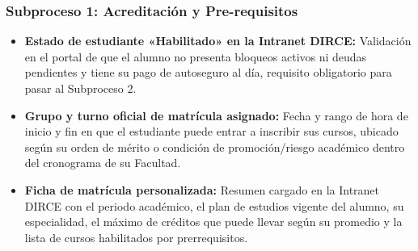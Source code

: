 \subsubsection{Subproceso 1: Acreditación y Pre-requisitos}

\begin{itemize}
    \item \textbf{Estado de estudiante «Habilitado» en la Intranet DIRCE:} Validación en el portal de que el alumno no presenta bloqueos activos ni deudas pendientes y tiene su pago de autoseguro al día, requisito obligatorio para pasar al Subproceso 2.

    \item \textbf{Grupo y turno oficial de matrícula asignado:} Fecha y rango de hora de inicio y fin en que el estudiante puede entrar a inscribir sus cursos, ubicado según su orden de mérito o condición de promoción/riesgo académico dentro del cronograma de su Facultad.

    \item \textbf{Ficha de matrícula personalizada:} Resumen cargado en la Intranet DIRCE con el periodo académico, el plan de estudios vigente del alumno, su especialidad, el máximo de créditos que puede llevar según su promedio y la lista de cursos habilitados por prerrequisitos.
\end{itemize}
